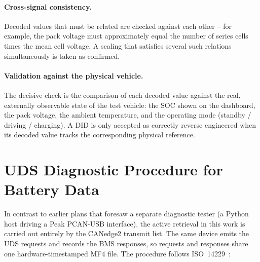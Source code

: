 \documentclass[11pt,a4paper,oneside,parskip=half]{scrreprt}
\begin{document}
\paragraph{Cross-signal consistency.} Decoded values that must be related are checked against each other -- for example, the pack voltage must approximately equal the number of series cells times the mean cell voltage. A scaling that satisfies several such relations simultaneously is taken as confirmed.

\paragraph{Validation against the physical vehicle.} The decisive check is the comparison of each decoded value against the real, externally observable state of the test vehicle: the SOC shown on the dashboard, the pack voltage, the ambient temperature, and the operating mode (standby / driving / charging). A DID is only accepted as correctly reverse engineered when its decoded value tracks the corresponding physical reference.

\section{UDS Diagnostic Procedure for Battery Data}
\label{sec:uds_procedure}
In contrast to earlier plans that foresaw a separate diagnostic tester (a Python host driving a Peak PCAN-USB interface), the active retrieval in this work is carried out entirely by the CANedge2 transmit list. The same device emits the UDS requests and records the BMS responses, so requests and responses share one hardware-timestamped MF4 file. The procedure follows ISO~14229~\cite{iso14229}:
\end{document}
